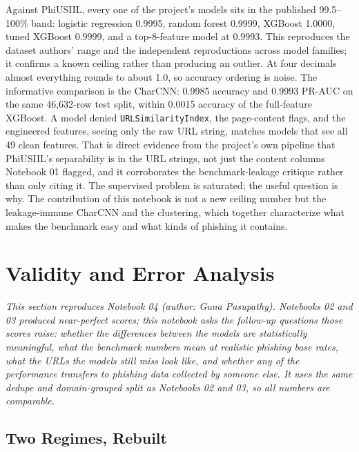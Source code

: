 \documentclass[stu,12pt,floatsintext]{apa7}
\newcommand{\code}[1]{\texttt{#1}}
\begin{document}
Against PhiUSIIL, every one of the project's models sits in the published
99.5--100\% band: logistic regression 0.9995, random forest 0.9999,
XGBoost 1.0000, tuned XGBoost 0.9999, and a top-8-feature model at 0.9993.
This reproduces the dataset authors' range and the independent
reproductions across model families; it confirms a known ceiling rather
than producing an outlier. At four decimals almost everything rounds to
about 1.0, so accuracy ordering is noise. The informative comparison is
the CharCNN: 0.9985 accuracy and 0.9993 PR-AUC on the same 46{,}632-row
test split, within 0.0015 accuracy of the full-feature XGBoost. A model
denied \code{URLSimilarityIndex}, the page-content flags, and the
engineered features, seeing only the raw URL string, matches models that
see all 49 clean features. That is direct evidence from the project's own
pipeline that PhiUSIIL's separability is in the URL strings, not just the
content columns Notebook 01 flagged, and it corroborates the
benchmark-leakage critique rather than only citing it. The supervised
problem is saturated; the useful question is why. The contribution of this
notebook is not a new ceiling number but the leakage-immune CharCNN and
the clustering, which together characterize what makes the benchmark easy
and what kinds of phishing it contains.

\section{Validity and Error Analysis}

\emph{This section reproduces Notebook 04 (author: Guna Pasupathy).
Notebooks 02 and 03 produced near-perfect scores; this notebook asks the
follow-up questions those scores raise: whether the differences between
the models are statistically meaningful, what the benchmark numbers mean
at realistic phishing base rates, what the URLs the models still miss
look like, and whether any of the performance transfers to phishing data
collected by someone else. It uses the same dedupe and domain-grouped
split as Notebooks 02 and 03, so all numbers are comparable.}

\subsection{Two Regimes, Rebuilt}
\end{document}

